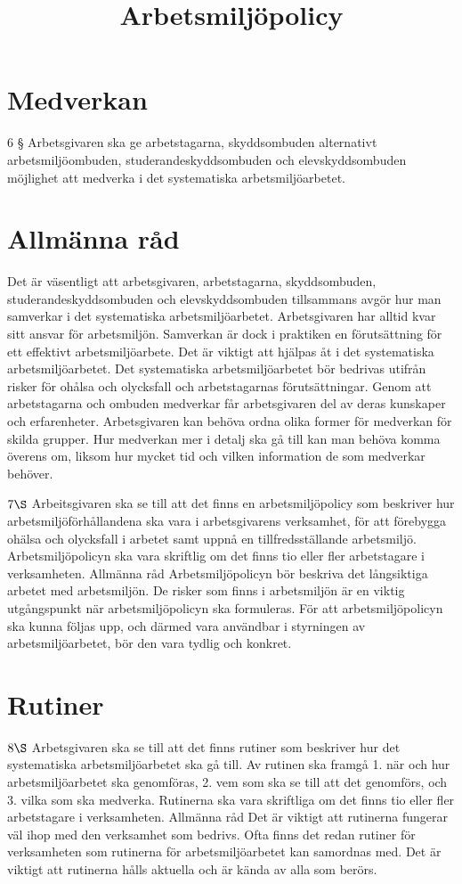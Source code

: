 \section*{Medverkan}
6 § Arbetsgivaren ska ge arbetstagarna, skyddsombuden alternativt arbetsmiljöombuden, studerandeskyddsombuden och elevskyddsombuden möjlighet att medverka i det systematiska arbetsmiljöarbetet.
\section*{Allmänna råd}
Det är väsentligt att arbetsgivaren, arbetstagarna, skyddsombuden, studerandeskyddsombuden och elevskyddsombuden tillsammans avgör hur man samverkar i det systematiska arbetsmiljöarbetet.
Arbetsgivaren har alltid kvar sitt ansvar för arbetsmiljön. Samverkan är dock i praktiken en förutsättning för ett effektivt arbetsmiljöarbete.
Det är viktigt att hjälpas åt i det systematiska arbetsmiljöarbetet. Det systematiska arbetsmiljöarbetet bör bedrivas utifrån risker för ohålsa och olycksfall och arbetstagarnas förutsättningar. Genom att arbetstagarna och ombuden medverkar får arbetsgivaren del av deras kunskaper och erfarenheter.
Arbetsgivaren kan behöva ordna olika former för medverkan för skilda grupper. Hur medverkan mer i detalj ska gå till kan man behöva komma överens om, liksom hur mycket tid och vilken information de som medverkar behöver.

\title{
Arbetsmiljöpolicy
}
\(7 \S\) Arbeitsgivaren ska se till att det finns en arbetsmiljöpolicy som beskriver hur arbetsmiljöförhållandena ska vara i arbetsgivarens verksamhet, för att förebygga ohälsa och olycksfall i arbetet samt uppnå en tillfredsställande arbetsmiljö.
Arbetsmiljöpolicyn ska vara skriftlig om det finns tio eller fler arbetstagare i verksamheten.
Allmänna råd
Arbetsmiljöpolicyn bör beskriva det långsiktiga arbetet med arbetsmiljön. De risker som finns i arbetsmiljön är en viktig utgångspunkt när arbetsmiljöpolicyn ska formuleras. För att arbetsmiljöpolicyn ska kunna följas upp, och därmed vara användbar i styrningen av arbetsmiljöarbetet, bör den vara tydlig och konkret.
\section*{Rutiner}
\(8 \S\) Arbetsgivaren ska se till att det finns rutiner som beskriver hur det systematiska arbetsmiljöarbetet ska gå till. Av rutinen ska framgå
1. när och hur arbetsmiljöarbetet ska genomföras,
2. vem som ska se till att det genomförs, och
3. vilka som ska medverka.
Rutinerna ska vara skriftliga om det finns tio eller fler arbetstagare i verksamheten.
Allmänna råd
Det är viktigt att rutinerna fungerar väl ihop med den verksamhet som bedrivs. Ofta finns det redan rutiner för verksamheten som rutinerna för arbetsmiljöarbetet kan samordnas med.
Det är viktigt att rutinerna hålls aktuella och är kända av alla som berörs.
